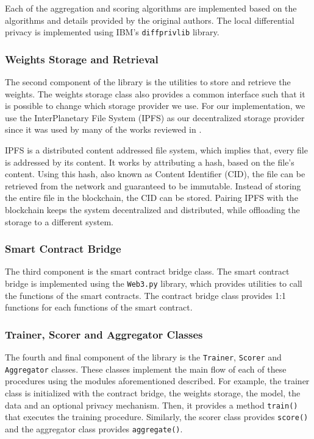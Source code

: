 Each of the aggregation and scoring algorithms are implemented based on the algorithms and details provided by the original authors. The local differential privacy is implemented using IBM's \texttt{diffprivlib} \cite{diffprivlib} library.

\subsubsection{Weights Storage and Retrieval}

The second component of the library is the utilities to store and retrieve the weights. The weights storage class also provides a common interface such that it is possible to change which storage provider we use. For our implementation, we use the InterPlanetary File System (IPFS) \cite{10.48550/arxiv.1407.3561}  as our decentralized storage provider since it was used by many of the works reviewed in .

IPFS is a distributed content addressed file system, which implies that, every file is addressed by its content. It works by attributing a hash, based on the file's content. Using this hash, also known as Content Identifier (CID), the file can be retrieved from the network and guaranteed to be immutable. Instead of storing the entire file in the blockchain, the CID can be stored. Pairing IPFS with the blockchain keeps the system decentralized and distributed, while offloading the storage to a different system.

\subsubsection{Smart Contract Bridge}

The third component is the smart contract bridge class. The smart contract bridge is implemented using the \texttt{Web3.py} \cite{web3py} library, which provides utilities to call the functions of the smart contracts. The contract bridge class provides 1:1 functions for each functions of the smart contract.

\subsubsection{Trainer, Scorer and Aggregator Classes}

The fourth and final component of the library is the \texttt{Trainer}, \texttt{Scorer} and \texttt{Aggregator} classes. These classes implement the main flow of each of these procedures using the modules aforementioned described. For example, the trainer class is initialized with the contract bridge, the weights storage, the model, the data and an optional privacy mechanism. Then, it provides a method \texttt{train()} that executes the training procedure. Similarly, the scorer class provides \texttt{score()} and the aggregator class provides \texttt{aggregate()}.

